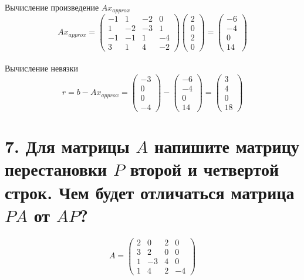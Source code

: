 \documentclass[a4paper,14pt]{article}
\begin{document}
Вычисление произведение $Ax_{approx}$
$$
Ax_{approx} = \begin{pmatrix}
    -1 & 1 & -2 & 0 \\
    1 & -2 & -3 & 1 \\
    -1 & -1 & 1 & -4 \\
    3 & 1 & 4 & -2
    \end{pmatrix}
    \begin{pmatrix}
    2 \\
    0 \\
    2 \\
    0
    \end{pmatrix}
    =
    \begin{pmatrix}
    -6 \\
    -4 \\
    0 \\
    14
    \end{pmatrix}
$$\\

Вычисление невязки
$$
r = b - Ax_{approx} = 
    \begin{pmatrix}
    -3 \\
    0 \\
    0 \\
    -4
    \end{pmatrix}
    -
    \begin{pmatrix}
    -6 \\
    -4 \\
    0 \\
    14
    \end{pmatrix}
    =
    \begin{pmatrix}
    3 \\
    4 \\
    0 \\
    18
    \end{pmatrix}
$$

\section{7. Для матрицы $A$ напишите матрицу перестановки $P$ второй и четвертой строк. Чем будет отличаться матрица $PA$ от $AP$?}
$$
A = \begin{pmatrix}
2 & 0 & 2 & 0 \\
3 & 2 & 0 & 0 \\
1 & -3 & 4 & 0 \\
1 & 4 & 2 & -4
\end{pmatrix}
$$\\
\end{document}

